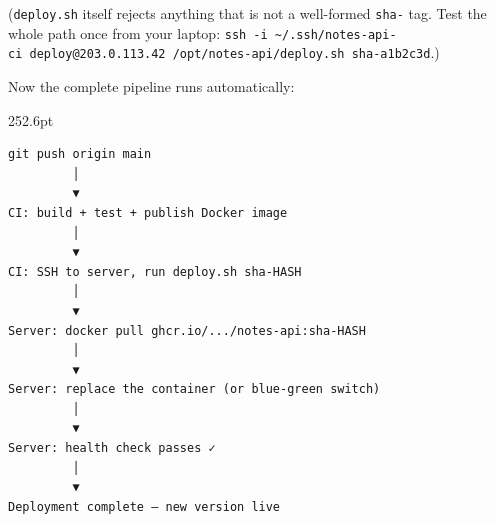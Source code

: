 \begin{codebox}[short]

\begin{Shaded}
\begin{Highlighting}[]
 
    \OperatorTok{\textless{}\textless{}\textless{}} \OperatorTok{:{-}}\VariableTok{\}}
\KeywordTok{[[} \OperatorTok{[}\OperatorTok{]:{-}}\VariableTok{\}} \OtherTok{==}  \KeywordTok{]]} \KeywordTok{||} \KeywordTok{\{}  \KeywordTok{;} \KeywordTok{;} \KeywordTok{\}}
\OperatorTok{[}\OperatorTok{]:{-}}\VariableTok{\}}
\end{Highlighting}
\end{Shaded}

\end{codebox}

\noindent{}(\texttt{deploy.sh} itself rejects anything that is not a well-formed \texttt{sha-} tag. Test the whole path once from your laptop: \texttt{ssh\ -}\allowbreak{}\texttt{i\ \textasciitilde{}/}\allowbreak{}\texttt{.}\allowbreak{}\texttt{ssh/}\allowbreak{}\texttt{notes-}\allowbreak{}\texttt{api-}\allowbreak{}\texttt{ci\ deploy@203.}\allowbreak{}\texttt{0.}\allowbreak{}\texttt{113.}\allowbreak{}\texttt{42\ /}\allowbreak{}\texttt{opt/}\allowbreak{}\texttt{notes-}\allowbreak{}\texttt{api/}\allowbreak{}\texttt{deploy.}\allowbreak{}\texttt{sh\ sha-}\allowbreak{}\texttt{a1b2c3d}.)

Now the complete pipeline runs automatically:

\begin{diagrambox}[short]{252.6pt}
\begin{Verbatim}[fontsize=\fontsize{9.0}{8.55}\selectfont]
git push origin main
         │
         ▼
CI: build + test + publish Docker image
         │
         ▼
CI: SSH to server, run deploy.sh sha-HASH
         │
         ▼
Server: docker pull ghcr.io/.../notes-api:sha-HASH
         │
         ▼
Server: replace the container (or blue-green switch)
         │
         ▼
Server: health check passes ✓
         │
         ▼
Deployment complete — new version live
\end{Verbatim}
\end{diagrambox}

